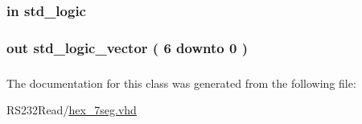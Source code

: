 \subsubsection[{R\+S\+T}]{ {\bfseries \textcolor{keywordflow}{in}\textcolor{vhdlchar}{ }} {\bfseries \textcolor{comment}{std\+\_\+logic}\textcolor{vhdlchar}{ }} \hspace{0.3cm}{\ttfamily [Port]}}\label{classhex__7seg_a98682ef7de2714e5bab788a2e2ff1b7f}
\hypertarget{classhex__7seg_a5bb18a11f9b29c18aee30a1b45131980}{}
\subsubsection[{S}]{ {\bfseries \textcolor{keywordflow}{out}\textcolor{vhdlchar}{ }} {\bfseries \textcolor{comment}{std\+\_\+logic\+\_\+vector}\textcolor{vhdlchar}{ }\textcolor{vhdlchar}{(}\textcolor{vhdlchar}{ }\textcolor{vhdlchar}{ } \textcolor{vhdldigit}{6} \textcolor{vhdlchar}{ }\textcolor{keywordflow}{downto}\textcolor{vhdlchar}{ }\textcolor{vhdlchar}{ } \textcolor{vhdldigit}{0} \textcolor{vhdlchar}{ }\textcolor{vhdlchar}{)}\textcolor{vhdlchar}{ }} \hspace{0.3cm}{\ttfamily [Port]}}\label{classhex__7seg_a5bb18a11f9b29c18aee30a1b45131980}
\hypertarget{classhex__7seg_acd03516902501cd1c7296a98e22c6fcb}{}
\subsubsection[{std\+\_\+logic\+\_\+1164}]{\hspace{0.3cm}{\ttfamily [Package]}}\label{classhex__7seg_acd03516902501cd1c7296a98e22c6fcb}


The documentation for this class was generated from the following file\+:\begin{DoxyCompactItemize}
\item 
R\+S232\+Read/\hyperlink{hex__7seg_8vhd}{hex\+\_\+7seg.\+vhd}\end{DoxyCompactItemize}
